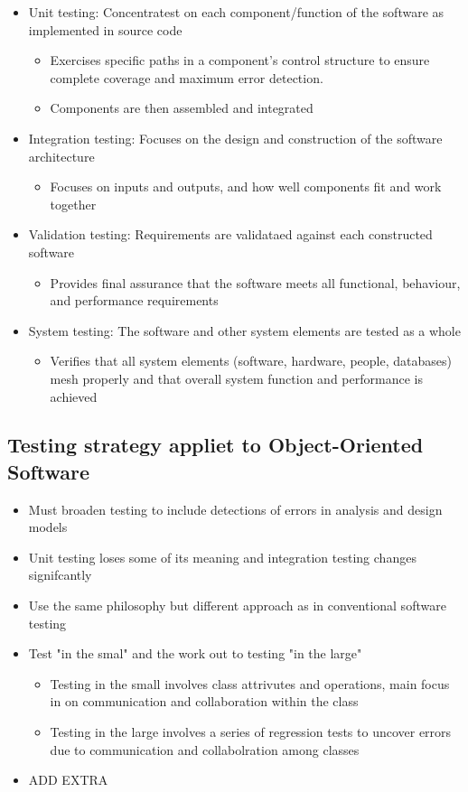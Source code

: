 \documentclass{article}
\begin{document}
\begin{itemize}
  \item Unit testing: Concentratest on each component/function of the software as implemented in source code
  \begin{itemize}
    \item Exercises specific paths in a component's control structure to ensure complete coverage and maximum error detection.
    \item Components are then assembled and integrated
  \end{itemize}
  \item Integration testing: Focuses on the design and construction of the software architecture
  \begin{itemize}
    \item Focuses on inputs and outputs, and how well components fit and work together
  \end{itemize}
  \item Validation testing: Requirements are validataed against each constructed software
  \begin{itemize}
    \item Provides final assurance that the software meets all functional, behaviour, and performance requirements
  \end{itemize}
  \item System testing: The software and other system elements are tested as a whole
  \begin{itemize}
    \item Verifies that all system elements (software, hardware, people, databases) mesh properly and that overall system function and performance is achieved
  \end{itemize}
\end{itemize}

\subsection{Testing strategy appliet to Object-Oriented Software}

\begin{itemize}
  \item Must broaden testing to include detections of errors in analysis and design models
  \item Unit testing loses some of its meaning and integration testing changes signifcantly
  \item Use the same philosophy but different approach as in conventional software testing
  \item Test "in the smal" and the work out to testing "in the large"
  \begin{itemize}
    \item Testing in the small involves class attrivutes and operations, main focus in on communication and collaboration within the class
    \item Testing in the large involves a series of regression tests to uncover errors due to communication and collabolration among classes
  \end{itemize}
  \item ADD EXTRA
\end{itemize}
\end{document}
